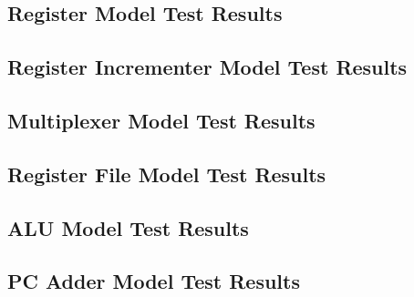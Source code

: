 \documentclass{article}
\begin{document}
\subsection{Register Model Test Results}

\subsection{Register Incrementer Model Test Results}

\subsection{Multiplexer Model Test Results}

\subsection{Register File Model Test Results}

\subsection{ALU Model Test Results}

\subsection{PC Adder Model Test Results}

\end{document}
